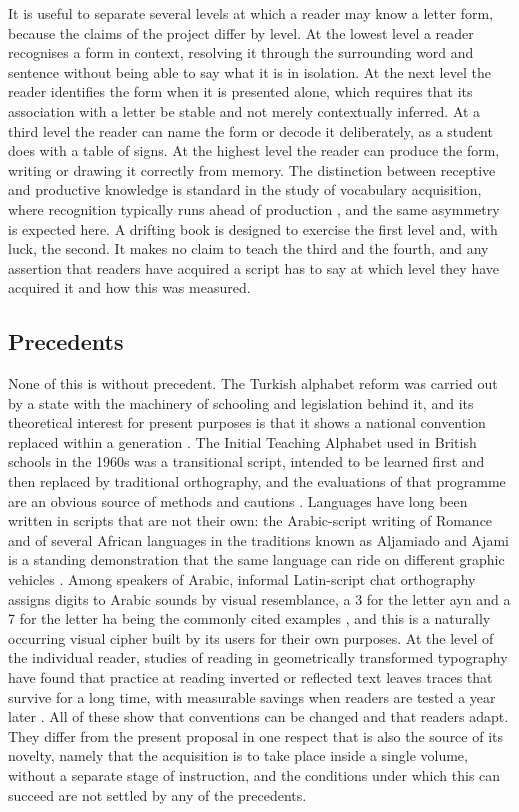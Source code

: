 It is useful to separate several levels at which a reader may know a letter form, because the claims of the project differ by level. At the lowest level a reader recognises a form in context, resolving it through the surrounding word and sentence without being able to say what it is in isolation. At the next level the reader identifies the form when it is presented alone, which requires that its association with a letter be stable and not merely contextually inferred. At a third level the reader can name the form or decode it deliberately, as a student does with a table of signs. At the highest level the reader can produce the form, writing or drawing it correctly from memory. The distinction between receptive and productive knowledge is standard in the study of vocabulary acquisition, where recognition typically runs ahead of production \citep{nation2001}, and the same asymmetry is expected here. A drifting book is designed to exercise the first level and, with luck, the second. It makes no claim to teach the third and the fourth, and any assertion that readers have acquired a script has to say at which level they have acquired it and how this was measured.

\subsection{Precedents}

None of this is without precedent. The Turkish alphabet reform was carried out by a state with the machinery of schooling and legislation behind it, and its theoretical interest for present purposes is that it shows a national convention replaced within a generation \citep{lewis1999}. The Initial Teaching Alphabet used in British schools in the 1960s was a transitional script, intended to be learned first and then replaced by traditional orthography, and the evaluations of that programme are an obvious source of methods and cautions \citep{downing1967}. Languages have long been written in scripts that are not their own: the Arabic-script writing of Romance and of several African languages in the traditions known as Aljamiado and Ajami is a standing demonstration that the same language can ride on different graphic vehicles \citep{daniels1996}. Among speakers of Arabic, informal Latin-script chat orthography assigns digits to Arabic sounds by visual resemblance, a 3 for the letter ayn and a 7 for the letter ha being the commonly cited examples \citep{palfreyman2003}, and this is a naturally occurring visual cipher built by its users for their own purposes. At the level of the individual reader, studies of reading in geometrically transformed typography have found that practice at reading inverted or reflected text leaves traces that survive for a long time, with measurable savings when readers are tested a year later \citep{kolers1976}. All of these show that conventions can be changed and that readers adapt. They differ from the present proposal in one respect that is also the source of its novelty, namely that the acquisition is to take place inside a single volume, without a separate stage of instruction, and the conditions under which this can succeed are not settled by any of the precedents.
